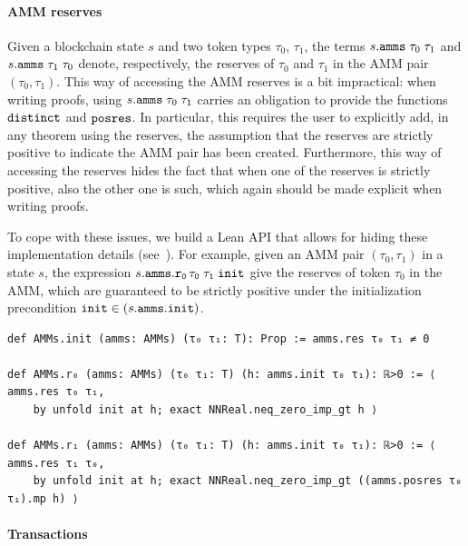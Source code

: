 \paragraph*{AMM reserves}

Given a blockchain state $s$ and two token types $\tau_0$, $\tau_1$,
the terms $s.\code{amms} \; \tau_0 \; \tau_1$
and $s.\code{amms} \; \tau_1 \; \tau_0$
denote, respectively, the reserves of $\tau_0$ and $\tau_1$
in the AMM pair $(\tau_0,\tau_1)$.
%
This way of accessing the AMM reserves is a bit impractical:
when writing proofs, using $s.\code{amms} \; \tau_0 \; \tau_1$
carries an obligation to provide the functions $\code{distinct}$ and $\code{posres}$.
In particular, this requires the user to explicitly add, in any theorem
using the reserves, the assumption that the reserves
are strictly positive to indicate the AMM pair has been created.
Furthermore, this way of accessing the reserves hides the
fact that when one of the reserves is strictly positive, 
also the other one is such, which again should be made explicit when
writing proofs.

To cope with these issues, 
we build a Lean API that allows for hiding these implementation details (see~). 
For example, given an AMM pair $(\tau_0, \tau_1)$ in a state $s$, 
the expression $s\code{.amms.r_0 \, \tau_0 \; \tau_1 \; init}$ 
give the reserves of token $\tau_0$ in the AMM, 
which are guaranteed to be strictly positive 
under the initialization precondition $\code{init} \in (s\code{.amms.init})$.

\begin{table}[t]
\caption{Fragment of the AMM API: AMM reserves.}
\label{list:ammapi}
\begin{lstlisting}
def AMMs.init (amms: AMMs) (τ₀ τ₁: T): Prop := amms.res τ₀ τ₁ ≠ 0

def AMMs.r₀ (amms: AMMs) (τ₀ τ₁: T) (h: amms.init τ₀ τ₁): ℝ>0 := ⟨ amms.res τ₀ τ₁, 
    by unfold init at h; exact NNReal.neq_zero_imp_gt h ⟩

def AMMs.r₁ (amms: AMMs) (τ₀ τ₁: T) (h: amms.init τ₀ τ₁): ℝ>0 := ⟨ amms.res τ₁ τ₀, 
    by unfold init at h; exact NNReal.neq_zero_imp_gt ((amms.posres τ₀ τ₁).mp h) ⟩
\end{lstlisting}
\end{table}

\paragraph*{Transactions}

